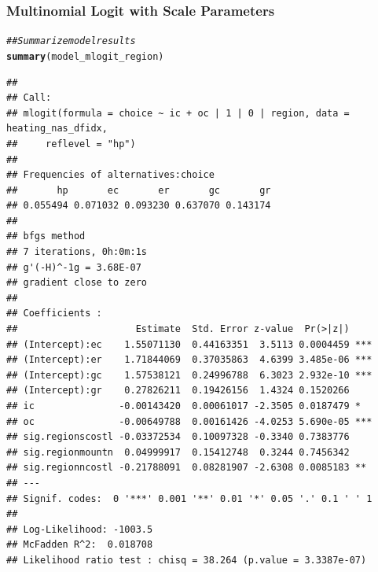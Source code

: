 \documentclass{beamer}\usepackage[]{graphicx}\usepackage[]{color}
\makeatletter
\newcommand{\hlcom}[1]{\textcolor[rgb]{0.678,0.584,0.686}{\textit{#1}}}%
\newcommand{\hlstd}[1]{\textcolor[rgb]{0.345,0.345,0.345}{#1}}%
\newcommand{\hlkwd}[1]{\textcolor[rgb]{0.737,0.353,0.396}{\textbf{#1}}}%
\newenvironment{kframe}{%
 \def\at@end@of@kframe{}%
 \ifinner\ifhmode%
  \def\at@end@of@kframe{\end{minipage}}%
  \begin{minipage}{\columnwidth}%
 \fi\fi%
 \def\FrameCommand##1{\hskip\@totalleftmargin \hskip-\fboxsep
 \colorbox{shadecolor}{##1}\hskip-\fboxsep
     \hskip-\linewidth \hskip-\@totalleftmargin \hskip\columnwidth}%
 \MakeFramed {\advance\hsize-\width
   \@totalleftmargin\z@ \linewidth\hsize
   \@setminipage}}%
 {\par\unskip\endMakeFramed%
 \at@end@of@kframe}
\newenvironment{knitrout}{}{} %
\makeatother
\begin{document}
\begin{frame}[fragile]\frametitle{Multinomial Logit with Scale Parameters}
    \vspace{0.5ex}
\begin{knitrout}\tiny
{}\color{fgcolor}\begin{kframe}
\begin{alltt}
\hlcom{## Summarize model results}
\hlkwd{summary}\hlstd{(model_mlogit_region)}
\end{alltt}
\begin{verbatim}
## 
## Call:
## mlogit(formula = choice ~ ic + oc | 1 | 0 | region, data = heating_nas_dfidx, 
##     reflevel = "hp")
## 
## Frequencies of alternatives:choice
##       hp       ec       er       gc       gr 
## 0.055494 0.071032 0.093230 0.637070 0.143174 
## 
## bfgs method
## 7 iterations, 0h:0m:1s 
## g'(-H)^-1g = 3.68E-07 
## gradient close to zero 
## 
## Coefficients :
##                     Estimate  Std. Error z-value  Pr(>|z|)    
## (Intercept):ec    1.55071130  0.44163351  3.5113 0.0004459 ***
## (Intercept):er    1.71844069  0.37035863  4.6399 3.485e-06 ***
## (Intercept):gc    1.57538121  0.24996788  6.3023 2.932e-10 ***
## (Intercept):gr    0.27826211  0.19426156  1.4324 0.1520266    
## ic               -0.00143420  0.00061017 -2.3505 0.0187479 *  
## oc               -0.00649788  0.00161426 -4.0253 5.690e-05 ***
## sig.regionscostl -0.03372534  0.10097328 -0.3340 0.7383776    
## sig.regionmountn  0.04999917  0.15412748  0.3244 0.7456342    
## sig.regionncostl -0.21788091  0.08281907 -2.6308 0.0085183 ** 
## ---
## Signif. codes:  0 '***' 0.001 '**' 0.01 '*' 0.05 '.' 0.1 ' ' 1
## 
## Log-Likelihood: -1003.5
## McFadden R^2:  0.018708 
## Likelihood ratio test : chisq = 38.264 (p.value = 3.3387e-07)
\end{verbatim}
\end{kframe}
\end{knitrout}
\end{frame}
\end{document}
